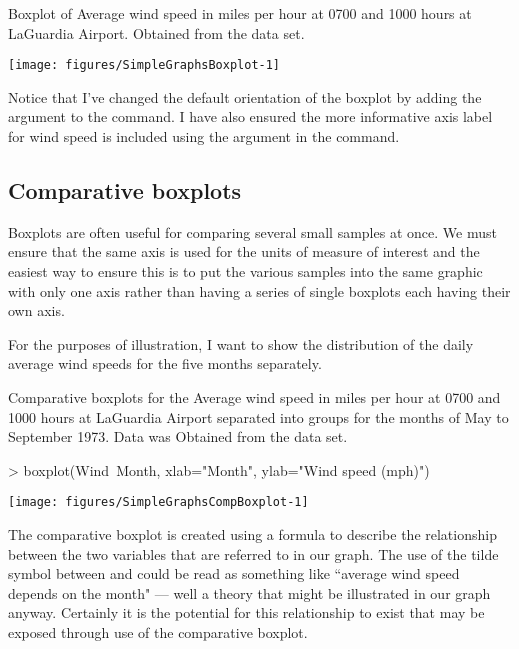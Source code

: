 \begin{exhibit} 
\begin{center} 
\caption{Boxplot of Average wind speed in miles per hour at 0700 and 1000 hours at LaGuardia Airport. Obtained from the  data set.} 
\label{AirQualityBoxplot} 
\begin{Schunk}

\texttt{[image: figures/SimpleGraphsBoxplot-1]} \end{Schunk}
\end{center} 
\end{exhibit} 
 
Notice that I've changed the default orientation of the boxplot by adding the argument  to the  command. I have also ensured the more informative axis label for wind speed is included using the  argument in the command. 
 
\subsection{Comparative boxplots} 
 
Boxplots are often useful for comparing several small samples at once. We must ensure that the same axis is used for the units of measure of interest and the easiest way to ensure this is to put the various samples into the same graphic with only one axis rather than having a series of single boxplots each having their own axis. 
 
For the purposes of illustration, I want to show the distribution of the daily average wind speeds for the five months separately.  
\begin{exhibit} 
\begin{center} 
\caption{Comparative boxplots for the Average wind speed in miles per hour at 0700 and 1000 hours at LaGuardia Airport separated into groups for the months of May to September 1973. Data was Obtained from the  data set.} 
\label{AirQualityCompBoxplotWindMonth} 
\begin{Schunk}
\begin{Sinput}
> boxplot(Wind~Month, xlab="Month", ylab="Wind speed (mph)") 
\end{Sinput}

\texttt{[image: figures/SimpleGraphsCompBoxplot-1]} \end{Schunk}
\end{center} 
\end{exhibit} 
The comparative boxplot is created using a formula to describe the relationship between the two variables that are referred to in our graph. The use of the tilde symbol between  and  could be read as something like ``average wind speed depends on the month" --- well a theory that might be illustrated in our graph anyway. Certainly it is the potential for this relationship to exist that may be exposed through use of the comparative boxplot. 
 
